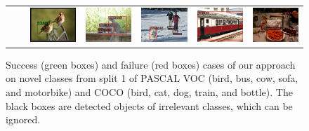 {\begin{figure}[!ht]
{\begin{tabular}{ccccccc}
			& \rotatebox{90}{\hspace{4mm}Failure} &
			\includegraphics[width=1in]{figs/coco_bird_b.pdf} & \includegraphics[width=1in]{figs/coco_cat_b.pdf} & \includegraphics[width=1in]{figs/coco_dog_b.pdf} & \includegraphics[width=1in]{figs/coco_train_b.pdf} & \includegraphics[width=1in]{figs/coco_bottle_b.pdf} \\
	\end{tabular}}
    \caption{Success (green boxes) and failure (red boxes) cases of our approach on novel classes from split 1 of PASCAL VOC (bird, bus, cow, sofa, and motorbike) and COCO (bird, cat, dog, train, and bottle). The black boxes are detected objects of irrelevant classes, which can be ignored. \vspace{1mm}}
    \label{fig:det-vis}
\end{figure}}

